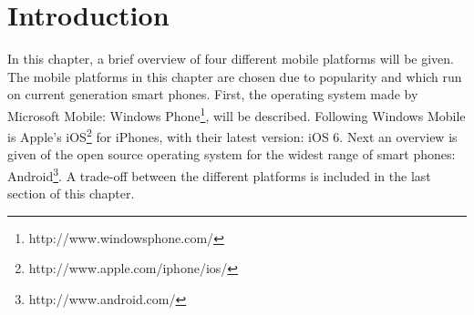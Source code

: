 \section{Introduction}
In this chapter, a brief overview of four different mobile platforms will be given. The mobile platforms in this chapter are chosen due to popularity and which run on current generation smart phones. First, the operating system made by Microsoft Mobile: Windows Phone\footnote{http://www.windowsphone.com/}, will be described. Following Windows Mobile is Apple's iOS\footnote{http://www.apple.com/iphone/ios/} for iPhones, with their latest version: iOS 6. Next an overview is given of the open source operating system for the widest range of smart phones: Android\footnote{http://www.android.com/}. A trade-off between the different platforms is included in the last section of this chapter.